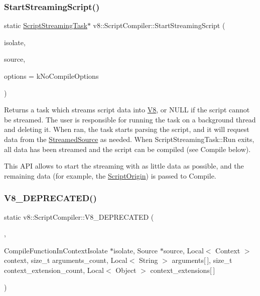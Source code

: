 \subsubsection{\texorpdfstring{Start\+Streaming\+Script()}{StartStreamingScript()}}
{\footnotesize\ttfamily static \mbox{\hyperlink{classv8_1_1ScriptCompiler_1_1ScriptStreamingTask}{Script\+Streaming\+Task}}$\ast$ v8\+::\+Script\+Compiler\+::\+Start\+Streaming\+Script (\begin{DoxyParamCaption}\item[{\mbox{\hyperlink{classv8_1_1Isolate}{Isolate}} $\ast$}]{isolate,  }\item[{\mbox{\hyperlink{classv8_1_1ScriptCompiler_1_1StreamedSource}{Streamed\+Source}} $\ast$}]{source,  }\item[{Compile\+Options}]{options = {\ttfamily kNoCompileOptions} }\end{DoxyParamCaption})\hspace{0.3cm}{\ttfamily [static]}}

Returns a task which streams script data into \mbox{\hyperlink{classv8_1_1V8}{V8}}, or N\+U\+LL if the script cannot be streamed. The user is responsible for running the task on a background thread and deleting it. When ran, the task starts parsing the script, and it will request data from the \mbox{\hyperlink{classv8_1_1ScriptCompiler_1_1StreamedSource}{Streamed\+Source}} as needed. When Script\+Streaming\+Task\+::\+Run exits, all data has been streamed and the script can be compiled (see Compile below).

This A\+PI allows to start the streaming with as little data as possible, and the remaining data (for example, the \mbox{\hyperlink{classv8_1_1ScriptOrigin}{Script\+Origin}}) is passed to Compile. \mbox{\label{classv8_1_1ScriptCompiler_adf81ab5e29be4318043f4fe76f2130bb}} 
\subsubsection{\texorpdfstring{V8\+\_\+\+D\+E\+P\+R\+E\+C\+A\+T\+E\+D()}{V8\_DEPRECATED()}}
{\footnotesize\ttfamily static v8\+::\+Script\+Compiler\+::\+V8\+\_\+\+D\+E\+P\+R\+E\+C\+A\+T\+ED (\begin{DoxyParamCaption}\item[{\char`\"{}Use maybe version\char`\"{}}]{,  }\item[{\mbox{\hyperlink{classv8_1_1Local}{Local}}$<$ \mbox{\hyperlink{classv8_1_1Function}{Function}} $>$ }]{Compile\+Function\+In\+ContextIsolate $\ast$isolate, Source $\ast$source, Local$<$ Context $>$ context, size\+\_\+t arguments\+\_\+count, Local$<$ String $>$ arguments\mbox{[}$\,$\mbox{]}, size\+\_\+t context\+\_\+extension\+\_\+count, Local$<$ Object $>$ context\+\_\+extensions\mbox{[}$\,$\mbox{]} }\end{DoxyParamCaption})\hspace{0.3cm}{\ttfamily [static]}}

